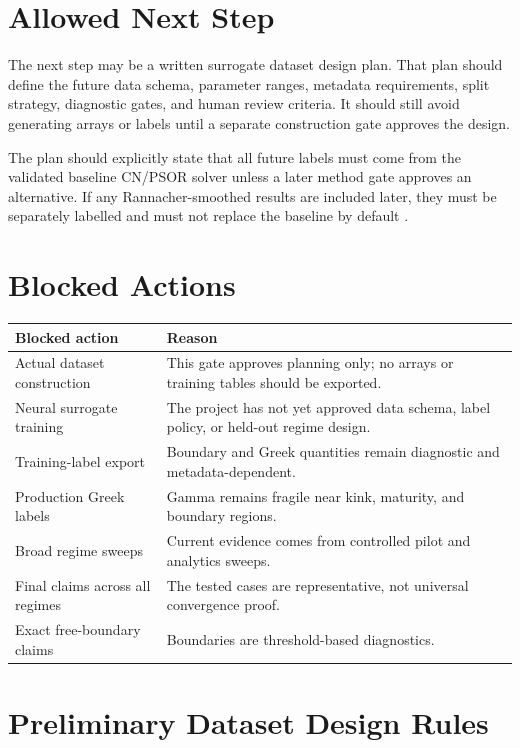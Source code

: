 \documentclass[11pt,a4paper]{article}
\begin{document}
\section{Allowed Next Step}

The next step may be a written surrogate dataset design plan. That plan should define the future
data schema, parameter ranges, metadata requirements, split strategy, diagnostic gates, and human
review criteria. It should still avoid generating arrays or labels until a separate construction
gate approves the design.

The plan should explicitly state that all future labels must come from the validated baseline
CN/PSOR solver unless a later method gate approves an alternative. If any Rannacher-smoothed
results are included later, they must be separately labelled and must not replace the baseline by
default \citep{rannacher_1984}.

\section{Blocked Actions}

\begin{longtable}{L{0.34\textwidth} L{0.46\textwidth}}
\toprule
Blocked action & Reason \\
\midrule
\endhead
Actual dataset construction & This gate approves planning only; no arrays or training tables should be exported. \\
Neural surrogate training & The project has not yet approved data schema, label policy, or held-out regime design. \\
Training-label export & Boundary and Greek quantities remain diagnostic and metadata-dependent. \\
Production Greek labels & Gamma remains fragile near kink, maturity, and boundary regions. \\
Broad regime sweeps & Current evidence comes from controlled pilot and analytics sweeps. \\
Final claims across all regimes & The tested cases are representative, not universal convergence proof. \\
Exact free-boundary claims & Boundaries are threshold-based diagnostics. \\
\bottomrule
\end{longtable}

\section{Preliminary Dataset Design Rules}
\end{document}
